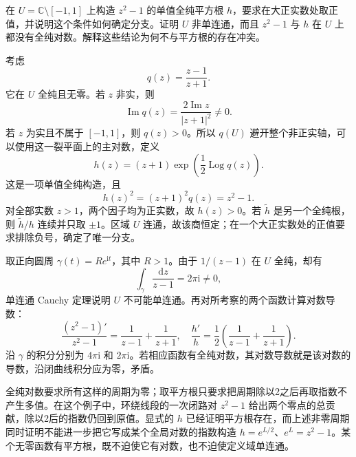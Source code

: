 \begin{exercise}\label{b3:ex:05-3}
在 \(U=\mathbb C\setminus[-1,1]\) 上构造 \(z^2-1\) 的单值全纯平方根 \(h\)，要求在大正实数处取正值，并说明这个条件如何确定分支。证明 \(U\) 非单连通，而且 \(z^2-1\) 与 \(h\) 在 \(U\) 上都没有全纯对数。解释这些结论为何不与平方根的存在冲突。
\end{exercise}
\begin{solution}
考虑
\[
 q(z)=\frac{z-1}{z+1}.
\]
它在 \(U\) 全纯且无零。若 \(z\) 非实，则
\[
 \operatorname{Im}q(z)=\frac{2\operatorname{Im}z}{|z+1|^2}\ne0.
\]
若 \(z\) 为实且不属于 \([-1,1]\)，则 \(q(z)>0\)。所以 \(q(U)\) 避开整个非正实轴，可以使用这一裂平面上的主对数，定义
\[
 h(z)=(z+1)\exp\left(\frac12\operatorname{Log}q(z)\right).
\]
这是一项单值全纯构造，且
\[
 h(z)^2=(z+1)^2q(z)=z^2-1.
\]
对全部实数 \(z>1\)，两个因子均为正实数，故 \(h(z)>0\)。若 \(\widetilde h\) 是另一个全纯根，则 \(\widetilde h/h\) 连续并只取 \(\pm1\)。区域 \(U\) 连通，故该商恒定；在一个大正实数处的正值要求排除负号，确定了唯一分支。

取正向圆周 \(\gamma(t)=Re^{\mathrm{i}t}\)，其中 \(R>1\)。由于 \(1/(z-1)\) 在 \(U\) 全纯，却有
\[
 \int_\gamma\frac{\mathrm{d}z}{z-1}=2\pi\mathrm{i}\ne0,
\]
单连通 Cauchy 定理说明 \(U\) 不可能单连通。再对所考察的两个函数计算对数导数：
\[
 \frac{(z^2-1)'}{z^2-1}
 =\frac1{z-1}+\frac1{z+1},
 \quad
 \frac{h'}h
 =\frac12\left(\frac1{z-1}+\frac1{z+1}\right).
\]
沿 \(\gamma\) 的积分分别为 \(4\pi\mathrm{i}\) 和 \(2\pi\mathrm{i}\)。若相应函数有全纯对数，其对数导数就是该对数的导数，沿闭曲线积分应为零，矛盾。

全纯对数要求所有这样的周期为零；取平方根只要求把周期除以2之后再取指数不产生多值。在这个例子中，环绕线段的一次闭路对 \(z^2-1\) 给出两个零点的总贡献，除以2后的指数仍回到原值。显式的 \(h\) 已经证明平方根存在，而上述非零周期同时证明不能进一步把它写成某个全局对数的指数构造 \(h=e^{L/2}\)、\(e^L=z^2-1\)。某个无零函数有平方根，既不迫使它有对数，也不迫使定义域单连通。
\end{solution}

